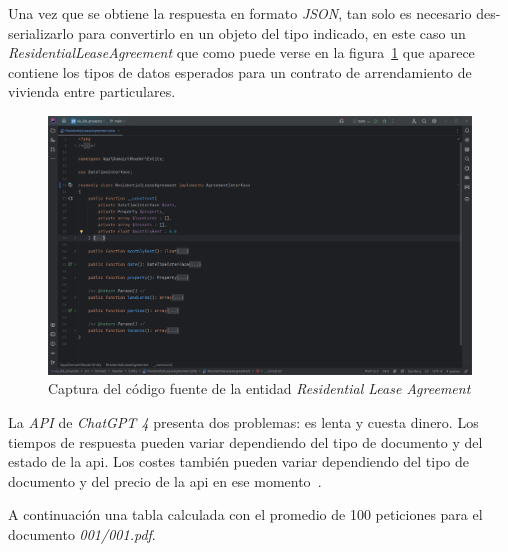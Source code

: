 Una vez que se obtiene la respuesta en formato \textit{JSON}, tan solo es necesario des-serializarlo para convertirlo
en un objeto del tipo indicado, en este caso un \textit{ResidentialLeaseAgreement} que como puede verse en la
figura~\ref{fig:chapter_4.4.residential_agreement} que aparece contiene los tipos de datos esperados para un contrato de
arrendamiento de vivienda entre particulares.

\begin{figure}[ht]
    \begin{center}
        \includegraphics[width=\textwidth]{./chapter/4/images/chapter_4.4.residential_lease_agreement}
        \caption{Captura del código fuente de la entidad \textit{Residential Lease Agreement}}
        \label{fig:chapter_4.4.residential_agreement}
    \end{center}
\end{figure}

La \textit{API} de \textit{ChatGPT 4} presenta dos problemas: es lenta y cuesta dinero.
Los tiempos de respuesta pueden variar dependiendo del tipo de documento y del estado de la api.
Los costes también pueden variar dependiendo del tipo de documento y del precio de la api en ese
momento~\cite{https://openai.com/api/pricing/}.

A continuación una tabla calculada con el promedio de 100 peticiones para el documento \textit{001/001.pdf}.

